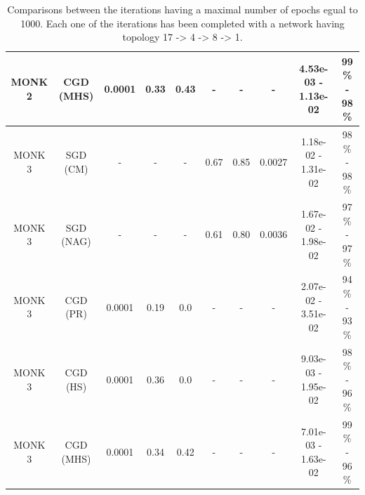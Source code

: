 \begin{table}[H]
\begin{subtable}{\textwidth}
{\begin{tabular}{| c | c | c | c | c | c | c | c | c | c |}
                            \hline
                            MONK 2 &  CGD (MHS) &   0.0001 &     0.33 &  0.43 &     - &      - &       - &  4.53e-03 - 1.13e-02 &  99 \% - 98 \% \\
                            \hline
                            \hline
                            MONK 3 &   SGD (CM) &        - &        - &     - &  0.67 &   0.85 &  0.0027 &  1.18e-02 - 1.31e-02 &  98 \% - 98 \% \\
                            \hline
                            MONK 3 &  SGD (NAG) &        - &        - &     - &  0.61 &   0.80 &  0.0036 &  1.67e-02 - 1.98e-02 &  97 \% - 97 \% \\
                            \hline
                            MONK 3 &   CGD (PR) &   0.0001 &     0.19 &  0.0 &     - &      - &       - &  2.07e-02 - 3.51e-02 &  94 \% - 93 \% \\
                            \hline
                            MONK 3 &   CGD (HS) &   0.0001 &     0.36 &  0.0 &     - &      - &       - &  9.03e-03 - 1.95e-02 &  98 \% - 96 \% \\
                            \hline
                            \rowcolor[gray]{.9}
                            MONK 3 &  CGD (MHS) &   0.0001 &     0.34 &  0.42 &     - &      - &       - &  7.01e-03 - 1.63e-02 &  99 \% - 96 \% \\
                            \hline
                        \end{tabular}
                    }
                \end{subtable}
                \caption{Comparisons between the iterations having a maximal number of epochs egual to 1000.
                Each one of the iterations has been completed with a network having topology
                17 -> 4 -> 8 -> 1.}
                \label{tab:monks_max_epochs}
            \end{table}

